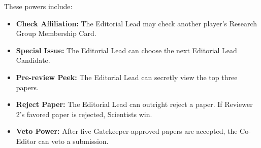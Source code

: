 \documentclass[sigplan,screen,nonacm]{acmart}
\begin{document}
These powers include:
\begin{itemize}
	\item \textbf{Check Affiliation:} The Editorial Lead may check another player's Research Group Membership Card.
	\item \textbf{Special Issue:} The Editorial Lead can choose the next Editorial Lead Candidate.
	\item \textbf{Pre-review Peek:} The Editorial Lead can secretly view the top three papers.
	\item \textbf{Reject Paper:} The Editorial Lead can outright reject a paper. If Reviewer 2's favored paper is rejected, Scientists win.
	\item \textbf{Veto Power:} After five Gatekeeper-approved papers are accepted, the Co-Editor can veto a submission.
\end{itemize}




\end{document}

